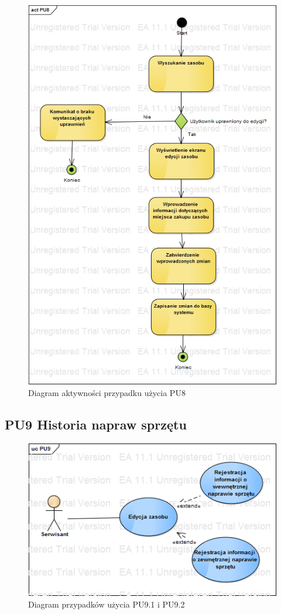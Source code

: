 \begin{figure}[h!]
	\centering
	\includegraphics[scale=0.6]{img/diagrams/activityDiagrams/PU8.png}
	\caption{Diagram aktywności przypadku użycia PU8 \label{fig:labelADPU8}}
\end{figure}

\subsection{PU9 Historia napraw sprzętu} \label{pu9}
\begin{figure}[h!]
	\centering
	\includegraphics[scale=0.6]{img/diagrams/useCaseDiagrams/PU9.png}
	\caption{Diagram przypadków użycia PU9.1 i PU9.2 \label{fig:labelUCPU9}}
\end{figure}

